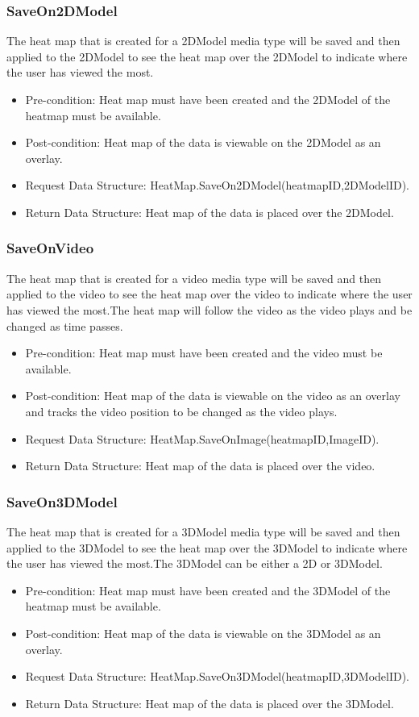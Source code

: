 	
	\subsubsection{SaveOn2DModel}
The heat map that is created for a 2DModel media type will be saved and then applied to the 2DModel to see the heat map over the 2DModel to indicate where the user has viewed the most.
	\begin{itemize}
		\item Pre-condition: Heat map must have been created and the 2DModel of the heatmap must be available.
		\item Post-condition: Heat map of the data is viewable on the 2DModel as an overlay.
		\item Request Data Structure: HeatMap.SaveOn2DModel(heatmapID,2DModelID).
		\item Return Data Structure: Heat map of the data is placed over the 2DModel.
	\end{itemize}


	\subsubsection{SaveOnVideo}
	The heat map that is created for a video media type will be saved and then applied to the video to see the heat map over the video to indicate where the user has viewed the most.The heat map will follow the video as the video plays and be changed as time passes.
	\begin{itemize}
		\item Pre-condition: Heat map must have been created and the video must be available.
		\item Post-condition: Heat map of the data is viewable on the video as an overlay  and tracks the video position to be changed as the video plays.
		\item Request Data Structure: HeatMap.SaveOnImage(heatmapID,ImageID).
		\item Return Data Structure: Heat map of the data is placed over the video.
	\end{itemize}

	\subsubsection{SaveOn3DModel}
	The heat map that is created for a 3DModel media type will be saved and then applied to the 3DModel to see the heat map over the 3DModel to indicate where the user has viewed the most.The 3DModel can be either a 2D or 3DModel.
	\begin{itemize}
		\item Pre-condition: Heat map must have been created and the 3DModel of the heatmap must be available.
		\item Post-condition: Heat map of the data is viewable on the 3DModel as an overlay.
		\item Request Data Structure: HeatMap.SaveOn3DModel(heatmapID,3DModelID).
		\item Return Data Structure: Heat map of the data is placed over the 3DModel.
	\end{itemize}
		
